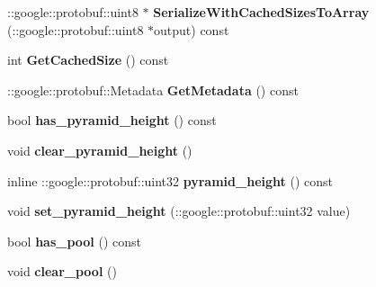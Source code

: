 \begin{DoxyCompactItemize}
\item 
\mbox{\label{classcaffe_1_1_s_p_p_parameter_a59304cdd006a70415b65b46952a186ee}} 
\+::google\+::protobuf\+::uint8 $\ast$ {\bfseries Serialize\+With\+Cached\+Sizes\+To\+Array} (\+::google\+::protobuf\+::uint8 $\ast$output) const
\item 
\mbox{\label{classcaffe_1_1_s_p_p_parameter_a8aeab4d91d1ffd8c69e22d5b545bf3e9}} 
int {\bfseries Get\+Cached\+Size} () const
\item 
\mbox{\label{classcaffe_1_1_s_p_p_parameter_a5e51257471547b9f8cd2e69faad90663}} 
\+::google\+::protobuf\+::\+Metadata {\bfseries Get\+Metadata} () const
\item 
\mbox{\label{classcaffe_1_1_s_p_p_parameter_a404c2d060ffb9f48e49bd62e6ca6f856}} 
bool {\bfseries has\+\_\+pyramid\+\_\+height} () const
\item 
\mbox{\label{classcaffe_1_1_s_p_p_parameter_ad5f7652114f6f0c5d34ac4c58462b0e3}} 
void {\bfseries clear\+\_\+pyramid\+\_\+height} ()
\item 
\mbox{\label{classcaffe_1_1_s_p_p_parameter_a8c6fc7e3d20e7d8d38720c67c9d53730}} 
inline \+::google\+::protobuf\+::uint32 {\bfseries pyramid\+\_\+height} () const
\item 
\mbox{\label{classcaffe_1_1_s_p_p_parameter_a3367bad43365879cb2af1f878255900b}} 
void {\bfseries set\+\_\+pyramid\+\_\+height} (\+::google\+::protobuf\+::uint32 value)
\item 
\mbox{\label{classcaffe_1_1_s_p_p_parameter_afa32fa9a2023906d030e7dc2431ce321}} 
bool {\bfseries has\+\_\+pool} () const
\item 
\mbox{\label{classcaffe_1_1_s_p_p_parameter_aaaff062a536f03c62014b5b84b58976d}} 
void {\bfseries clear\+\_\+pool} ()
\item 
\mbox{\label{classcaffe_1_1_s_p_p_parameter_a69b503d0aa1ac3be1dfa22d47bbc9259}} 

\end{DoxyCompactItemize}
